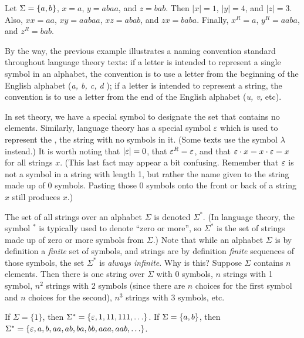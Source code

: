 \begin{example}
Let $\Sigma = \mbox{$\{a,b\}$}$, $x=a$, $y=abaa$, and $z=bab$.
Then $|x| = 1$, $|y| = 4$, and $|z|=3$.  Also, $xx = aa$, $xy =
aabaa$, $xz = abab$, and $zx = baba$.  Finally, $x^R = a$,
$y^R = aaba$, and $z^R=bab$.
\end{example}

\smallskip

By the way, the previous example illustrates a naming convention standard
throughout language theory texts: if a letter is
intended to represent a single symbol in an alphabet, the convention
is to use a letter from the beginning of the English alphabet ({\em a,
b, c, d }); if a letter is intended to represent a string, the 
convention is to use a letter from the end of the English alphabet
({\em u, v, } etc).

\bigskip

In set theory, we have a special symbol to designate the set that 
contains no elements.  Similarly, language theory has a special 
symbol $\varepsilon$ which is used to represent the , the
string with no 
symbols in it.  (Some texts use the symbol $\lambda$ instead.)
It is worth noting that $|\varepsilon| = 0$, that $\varepsilon^R = \varepsilon$,
and that $\varepsilon \cdot x = x \cdot \varepsilon = x$ for all strings $x$.
(This last fact may appear a bit confusing.  Remember that $\varepsilon$
is not a symbol in a string with length 1, but rather the name given
to the string made up of 0 symbols.  Pasting those 0 symbols onto the
front or back of a string $x$ still produces $x$.) 

\bigskip

The set of all strings over an alphabet $\Sigma$ is denoted $\Sigma^*$.
(In language theory, the symbol $^*$ is typically used to denote ``zero
or more'', so $\Sigma^*$ is the set of strings made up of zero or 
more symbols from $\Sigma$.)  Note that while an alphabet 
$\Sigma$ is by 
definition a \emph{finite} set of symbols, and strings are by
definition \emph{finite} sequences of those symbols, the set $\Sigma^*$
is \emph{always infinite}.  Why is this?  Suppose $\Sigma$ contains $n$
elements.  Then there is one string over $\Sigma$ with 0 symbols,
$n$ strings with 1 symbol, $n^2$ strings with 2 symbols (since there
are $n$ choices for the first symbol and $n$ choices for the second),
$n^3$ strings with 3 symbols, etc.

\smallskip

\begin{example} If $\Sigma = \{1\}$, then $\Sigma^* = \{\varepsilon,
1, 11, 111, \ldots\}$.  If $\Sigma = \mbox{$\{a,b\}$}$, then $\Sigma^* = \{
\varepsilon, a, b, aa, ab, ba, bb, aaa, aab, \ldots\}$.
\end{example}

